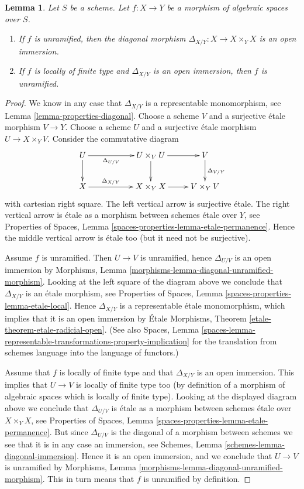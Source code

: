 \documentclass[10pt,a4paper]{amsart}
\theoremstyle{plain}
\newtheorem{lemma}[subsection]{Lemma}
\theoremstyle{definition}
\theoremstyle{remark}
\numberwithin{equation}{subsection}
\begin{document}
\begin{lemma}
\label{lemma-diagonal-unramified-morphism}
Let $S$ be a scheme.
Let $f : X \to Y$ be a morphism of algebraic spaces over $S$.
\begin{enumerate}
\item If $f$ is unramified, then the diagonal morphism
$\Delta_{X/Y} : X \to X \times_Y X$ is an open immersion.
\item If $f$ is locally of finite type
and $\Delta_{X/Y}$ is an open immersion, then $f$ is unramified.
\end{enumerate}
\end{lemma}

\begin{proof}
We know in any case that $\Delta_{X/Y}$ is a representable monomorphism, see
Lemma \ref{lemma-properties-diagonal}.
Choose a scheme $V$ and a surjective \'etale morphism $V \to Y$.
Choose a scheme $U$ and a surjective \'etale morphism $U \to X \times_Y V$.
Consider the commutative diagram
$$
\xymatrix{
U \ar[d] \ar[rr]_-{\Delta_{U/V}} & &
U \times_V U \ar[d] \ar[r] &
V \ar[d]^{\Delta_{V/Y}} \\
X \ar[rr]^-{\Delta_{X/Y}} & &
X \times_Y X \ar[r] &
V \times_Y V
}
$$
with cartesian right square. The left vertical arrow is surjective \'etale.
The right vertical arrow is \'etale as a morphism between schemes
\'etale over $Y$, see
Properties of Spaces,
Lemma \ref{spaces-properties-lemma-etale-permanence}.
Hence the middle vertical arrow is \'etale too (but it need not be
surjective).

\medskip\noindent
Assume $f$ is unramified. Then $U \to V$ is unramified, hence
$\Delta_{U/V}$ is an open immersion by
Morphisms, Lemma \ref{morphisms-lemma-diagonal-unramified-morphism}.
Looking at the left square of the diagram above we conclude that
$\Delta_{X/Y}$ is an \'etale morphism, see
Properties of Spaces,
Lemma \ref{spaces-properties-lemma-etale-local}.
Hence $\Delta_{X/Y}$ is a representable \'etale monomorphism, which
implies that it is an open immersion by
\'Etale Morphisms, Theorem \ref{etale-theorem-etale-radicial-open}.
(See also
Spaces, Lemma
\ref{spaces-lemma-representable-transformations-property-implication}
for the translation from schemes language into the language of functors.)

\medskip\noindent
Assume that $f$ is locally of finite type and that $\Delta_{X/Y}$
is an open immersion. This implies that $U \to V$ is locally of finite
type too (by definition of a morphism of algebraic spaces which is
locally of finite type). Looking at the displayed diagram above
we conclude that $\Delta_{U/V}$ is \'etale as a morphism between
schemes \'etale over $X \times_Y X$, see
Properties of Spaces,
Lemma \ref{spaces-properties-lemma-etale-permanence}.
But since $\Delta_{U/V}$ is the diagonal of a morphism between schemes
we see that it is in any case an immersion, see
Schemes, Lemma \ref{schemes-lemma-diagonal-immersion}.
Hence it is an open immersion, and we conclude
that $U \to V$ is unramified by
Morphisms, Lemma \ref{morphisms-lemma-diagonal-unramified-morphism}.
This in turn means that $f$ is unramified by definition.
\end{proof}
\end{document}
